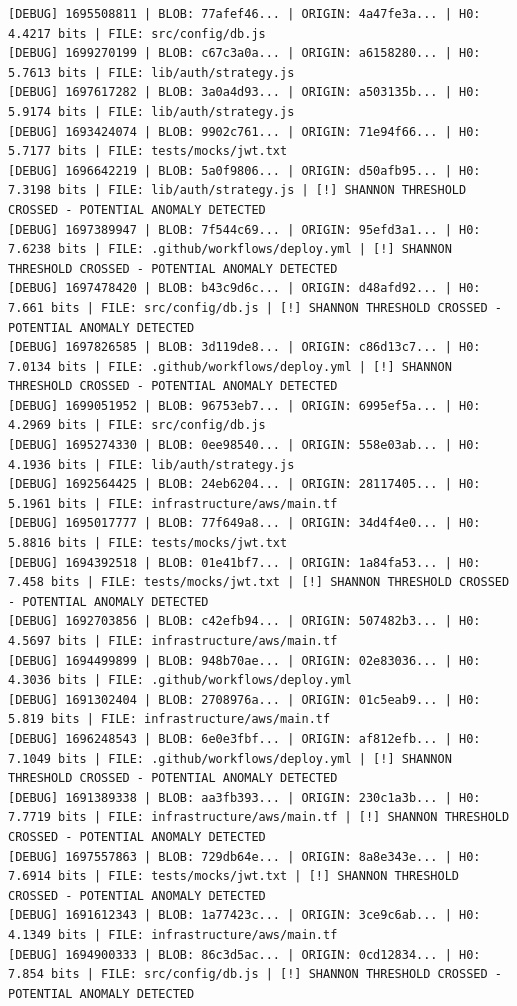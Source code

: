 \documentclass[12pt, a4paper, oneside]{report}
\begin{document}
\begin{lstlisting}[basicstyle=\tiny\ttfamily]
[DEBUG] 1695508811 | BLOB: 77afef46... | ORIGIN: 4a47fe3a... | H0: 4.4217 bits | FILE: src/config/db.js
[DEBUG] 1699270199 | BLOB: c67c3a0a... | ORIGIN: a6158280... | H0: 5.7613 bits | FILE: lib/auth/strategy.js
[DEBUG] 1697617282 | BLOB: 3a0a4d93... | ORIGIN: a503135b... | H0: 5.9174 bits | FILE: lib/auth/strategy.js
[DEBUG] 1693424074 | BLOB: 9902c761... | ORIGIN: 71e94f66... | H0: 5.7177 bits | FILE: tests/mocks/jwt.txt
[DEBUG] 1696642219 | BLOB: 5a0f9806... | ORIGIN: d50afb95... | H0: 7.3198 bits | FILE: lib/auth/strategy.js | [!] SHANNON THRESHOLD CROSSED - POTENTIAL ANOMALY DETECTED
[DEBUG] 1697389947 | BLOB: 7f544c69... | ORIGIN: 95efd3a1... | H0: 7.6238 bits | FILE: .github/workflows/deploy.yml | [!] SHANNON THRESHOLD CROSSED - POTENTIAL ANOMALY DETECTED
[DEBUG] 1697478420 | BLOB: b43c9d6c... | ORIGIN: d48afd92... | H0: 7.661 bits | FILE: src/config/db.js | [!] SHANNON THRESHOLD CROSSED - POTENTIAL ANOMALY DETECTED
[DEBUG] 1697826585 | BLOB: 3d119de8... | ORIGIN: c86d13c7... | H0: 7.0134 bits | FILE: .github/workflows/deploy.yml | [!] SHANNON THRESHOLD CROSSED - POTENTIAL ANOMALY DETECTED
[DEBUG] 1699051952 | BLOB: 96753eb7... | ORIGIN: 6995ef5a... | H0: 4.2969 bits | FILE: src/config/db.js
[DEBUG] 1695274330 | BLOB: 0ee98540... | ORIGIN: 558e03ab... | H0: 4.1936 bits | FILE: lib/auth/strategy.js
[DEBUG] 1692564425 | BLOB: 24eb6204... | ORIGIN: 28117405... | H0: 5.1961 bits | FILE: infrastructure/aws/main.tf
[DEBUG] 1695017777 | BLOB: 77f649a8... | ORIGIN: 34d4f4e0... | H0: 5.8816 bits | FILE: tests/mocks/jwt.txt
[DEBUG] 1694392518 | BLOB: 01e41bf7... | ORIGIN: 1a84fa53... | H0: 7.458 bits | FILE: tests/mocks/jwt.txt | [!] SHANNON THRESHOLD CROSSED - POTENTIAL ANOMALY DETECTED
[DEBUG] 1692703856 | BLOB: c42efb94... | ORIGIN: 507482b3... | H0: 4.5697 bits | FILE: infrastructure/aws/main.tf
[DEBUG] 1694499899 | BLOB: 948b70ae... | ORIGIN: 02e83036... | H0: 4.3036 bits | FILE: .github/workflows/deploy.yml
[DEBUG] 1691302404 | BLOB: 2708976a... | ORIGIN: 01c5eab9... | H0: 5.819 bits | FILE: infrastructure/aws/main.tf
[DEBUG] 1696248543 | BLOB: 6e0e3fbf... | ORIGIN: af812efb... | H0: 7.1049 bits | FILE: .github/workflows/deploy.yml | [!] SHANNON THRESHOLD CROSSED - POTENTIAL ANOMALY DETECTED
[DEBUG] 1691389338 | BLOB: aa3fb393... | ORIGIN: 230c1a3b... | H0: 7.7719 bits | FILE: infrastructure/aws/main.tf | [!] SHANNON THRESHOLD CROSSED - POTENTIAL ANOMALY DETECTED
[DEBUG] 1697557863 | BLOB: 729db64e... | ORIGIN: 8a8e343e... | H0: 7.6914 bits | FILE: tests/mocks/jwt.txt | [!] SHANNON THRESHOLD CROSSED - POTENTIAL ANOMALY DETECTED
[DEBUG] 1691612343 | BLOB: 1a77423c... | ORIGIN: 3ce9c6ab... | H0: 4.1349 bits | FILE: infrastructure/aws/main.tf
[DEBUG] 1694900333 | BLOB: 86c3d5ac... | ORIGIN: 0cd12834... | H0: 7.854 bits | FILE: src/config/db.js | [!] SHANNON THRESHOLD CROSSED - POTENTIAL ANOMALY DETECTED
\end{lstlisting}
\end{document}
